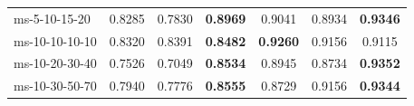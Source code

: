 \begin{table}[!t]
\begin{tabular}{lcccccc}
    ms-5-10-15-20                 & 0.8285                           & 0.7830                           & \textbf{0.8969} & 0.9041                           & 0.8934                           & \textbf{0.9346} \\
    ms-10-10-10-10 & 0.8320 & 0.8391 & \textbf{0.8482} & \textbf{0.9260} & 0.9156 & 0.9115 \\
    ms-10-20-30-40                 & 0.7526                           & 0.7049                           & \textbf{0.8534} & 0.8945                           & 0.8734                           & \textbf{0.9352} \\
    ms-10-30-50-70                 & 0.7940                           & 0.7776                           & \textbf{0.8555} & 0.8729                           & 0.9156                           & \textbf{0.9344} \\

\end{tabular}
\end{table}
